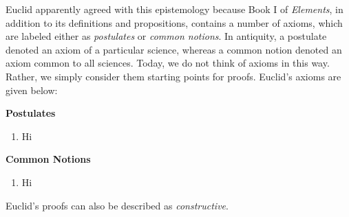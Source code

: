 \begin{tcolorbox}[breakable, enhanced, colback=textbook-blue, sharp corners]
	Euclid apparently agreed with this epistemology because Book I of \textit{Elements}, in addition to its definitions and propositions, contains a number of axioms, which are labeled either as \textit{postulates} or \textit{common notions}. In antiquity, a postulate denoted an axiom of a particular science, whereas a common notion denoted an axiom common to all sciences. Today, we do not think of axioms in this way. Rather, we simply consider them starting points for proofs. Euclid's axioms are given below: \\
	
	\begin{center}
		\textbf{Postulates}
		\begin{enumerate}
			\item Hi
		\end{enumerate}
		\textbf{Common Notions}
		\begin{enumerate}
			\item Hi
		\end{enumerate}
		
	\end{center}
	
	Euclid's proofs can also be described as \textit{constructive}. \\
	
	
	
	\vspace{3mm}
\end{tcolorbox}
\vspace{2\baselineskip}

